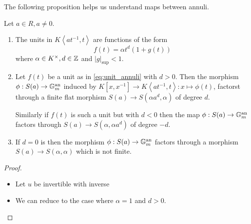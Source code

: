 \documentclass[a4paper]{article}
\begin{document}
The following proposition helps us understand maps between annuli. 
\begin{proposition}
	[2.2 in paper]
	Let $a \in R, a \ne 0$.
	\begin{enumerate}
		\item 
			The units in $K \left<a t^{-1}, t \right>$ are functions of the form 
			\begin{equation}\label{eq:unit_annuli}
				f(t) = \alpha t ^{d}(1 + g(t))
			\end{equation}
			where $\alpha \in K^{\times }, d \in \mathbb{Z}$ and $|g|_\text{sup}  < 1$.
		\item Let $f(t)$ be a unit as in \eqref{eq:unit_annuli} with  $d > 0$.
			Then the morphism $\phi:S(a) \to \mathbb{G} _m ^{\mathrm{an}}$ induced by $K[x, x^{-1}] \to K\left<a t^{-1}, t \right> : x \mapsto \phi(t)$, factorst through a finite flat morphism $S(a) \to S(\alpha a^{d}, \alpha)$ of degree $d$. 

			Similarly if $f(t)$ is such a unit but with $d <0$ then the map $\phi: S(a) \to \mathbb{G} _m ^{\mathrm{an}}$ factors through $S(a) \to S(\alpha, \alpha a^{d})$ of degree $-d$. 

		\item If $d = 0$ is then the morphism $\phi: S(a) \to \mathbb{G} _m ^{\mathrm{an}}$ factors through a morphism $S(a) \to S(\alpha, \alpha)$ which is not finite. 
	\end{enumerate}

\end{proposition}
\begin{proof}
	\begin{itemize}
		\item {}
			Let $u$ be invertible with inverse 
		\item We can reduce to the case where $\alpha = 1$ and $d > 0$. 

	\end{itemize}
\end{proof}

\printbibliography 
\end{document}
